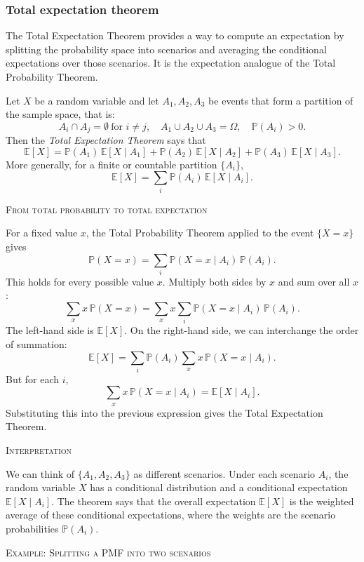 \subsubsection{Total expectation theorem}

The Total Expectation Theorem provides a way to compute an expectation by splitting the probability space into scenarios and averaging the conditional expectations over those scenarios.  
It is the expectation analogue of the Total Probability Theorem.

Let \(X\) be a random variable and let \(A_1, A_2, A_3\) be events that form a partition of the sample space, that is:
\[
A_i \cap A_j = \emptyset \ \text{for } i \ne j, 
\quad A_1 \cup A_2 \cup A_3 = \Omega,
\quad \mathbb{P}(A_i) > 0.
\]
Then the \textit{Total Expectation Theorem} says that
\[
\mathbb{E}[X]
= \mathbb{P}(A_1)\,\mathbb{E}[X \mid A_1]
+ \mathbb{P}(A_2)\,\mathbb{E}[X \mid A_2]
+ \mathbb{P}(A_3)\,\mathbb{E}[X \mid A_3].
\]
More generally, for a finite or countable partition \(\{A_i\}\),
\[
\mathbb{E}[X] = \sum_i \mathbb{P}(A_i)\,\mathbb{E}[X \mid A_i].
\]

\bigskip\textsc{From total probability to total expectation}

For a fixed value \(x\), the Total Probability Theorem applied to the event \(\{X = x\}\) gives
\[
\mathbb{P}(X = x)
= \sum_i \mathbb{P}(X = x \mid A_i)\,\mathbb{P}(A_i).
\]
This holds for every possible value \(x\).  
Multiply both sides by \(x\) and sum over all \(x\):
\[
\sum_x x\,\mathbb{P}(X = x)
= \sum_x x \sum_i \mathbb{P}(X = x \mid A_i)\,\mathbb{P}(A_i).
\]
The left-hand side is \(\mathbb{E}[X]\).  
On the right-hand side, we can interchange the order of summation:
\[
\mathbb{E}[X]
= \sum_i \mathbb{P}(A_i) \sum_x x\,\mathbb{P}(X = x \mid A_i).
\]
But for each \(i\),
\[
\sum_x x\,\mathbb{P}(X = x \mid A_i)
= \mathbb{E}[X \mid A_i].
\]
Substituting this into the previous expression gives the Total Expectation Theorem.

\bigskip\textsc{Interpretation}

We can think of \(\{A_1, A_2, A_3\}\) as different scenarios.  
Under each scenario \(A_i\), the random variable \(X\) has a conditional distribution and a conditional expectation \(\mathbb{E}[X \mid A_i]\).  
The theorem says that the overall expectation \(\mathbb{E}[X]\) is the weighted average of these conditional expectations, where the weights are the scenario probabilities \(\mathbb{P}(A_i)\).

\bigskip\textsc{Example: Splitting a PMF into two scenarios}

